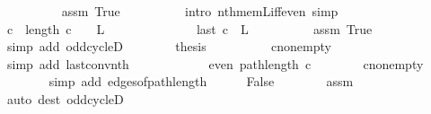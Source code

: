 \begin{isabellebody}
\ \ \ \ \ \ \ \ \isamarkupfalse%
\ assm\ True\isanewline
\ \ \ \ \ \ \ \ \isamarkupfalse%
\ {\isacharparenleft}{\kern0pt}intro\ nth{\isacharunderscore}{\kern0pt}mem{\isacharunderscore}{\kern0pt}L{\isacharunderscore}{\kern0pt}iff{\isacharunderscore}{\kern0pt}even{\isacharparenright}{\kern0pt}\ simp\ \isacommand{{\isacharbraceright}{\kern0pt}}\isamarkupfalse%
\isanewline
\ \ \ \ \isamarkupfalse%
\ \isamarkupfalse%
\ {\isachardoublequoteopen}c\ {\isacharbang}{\kern0pt}\ {\isacharparenleft}{\kern0pt}length\ c\ {\isacharminus}{\kern0pt}\ {}{\isacharparenright}{\kern0pt}\ {\isasymin}\ L{\isachardoublequoteclose}\isanewline
\ \ \ \ \isamarkupfalse%
\ {\isacharminus}{\kern0pt}\isanewline
\ \ \ \ \ \ \isamarkupfalse%
\ {\isachardoublequoteopen}last\ c\ {\isasymin}\ L{\isachardoublequoteclose}\isanewline
\ \ \ \ \ \ \ \ \isamarkupfalse%
\ assm\ True\isanewline
\ \ \ \ \ \ \ \ \isamarkupfalse%
\ {\isacharparenleft}{\kern0pt}simp\ add{\isacharcolon}{\kern0pt}\ odd{\isacharunderscore}{\kern0pt}cycleD{\isacharparenleft}{\kern0pt}{}{\isacharparenright}{\kern0pt}{\isacharparenright}{\kern0pt}\isanewline
\ \ \ \ \ \ \isamarkupfalse%
\ {\isacharquery}{\kern0pt}thesis\isanewline
\ \ \ \ \ \ \ \ \isamarkupfalse%
\ c{\isacharunderscore}{\kern0pt}non{\isacharunderscore}{\kern0pt}empty\isanewline
\ \ \ \ \ \ \ \ \isamarkupfalse%
\ {\isacharparenleft}{\kern0pt}simp\ add{\isacharcolon}{\kern0pt}\ last{\isacharunderscore}{\kern0pt}conv{\isacharunderscore}{\kern0pt}nth{\isacharparenright}{\kern0pt}\isanewline
\ \ \ \ \isamarkupfalse%
\isanewline
\ \ \ \ \isamarkupfalse%
\ \isamarkupfalse%
\ {\isachardoublequoteopen}even\ {\isacharparenleft}{\kern0pt}path{\isacharunderscore}{\kern0pt}length\ c{\isacharparenright}{\kern0pt}{\isachardoublequoteclose}\isanewline
\ \ \ \ \ \ \isamarkupfalse%
\ c{\isacharunderscore}{\kern0pt}non{\isacharunderscore}{\kern0pt}empty\isanewline
\ \ \ \ \ \ \isamarkupfalse%
\ {\isacharparenleft}{\kern0pt}simp\ add{\isacharcolon}{\kern0pt}\ edges{\isacharunderscore}{\kern0pt}of{\isacharunderscore}{\kern0pt}path{\isacharunderscore}{\kern0pt}length{\isacharparenright}{\kern0pt}\isanewline
\ \ \ \ \isamarkupfalse%
\ False\isanewline
\ \ \ \ \ \ \isamarkupfalse%
\ assm\isanewline
\ \ \ \ \ \ \isamarkupfalse%
\ {\isacharparenleft}{\kern0pt}auto\ dest{\isacharcolon}{\kern0pt}\ odd{\isacharunderscore}{\kern0pt}cycleD{\isacharparenleft}{\kern0pt}{}{\isacharparenright}{\kern0pt}{\isacharparenright}{\kern0pt}\isanewline

\end{isabellebody}
